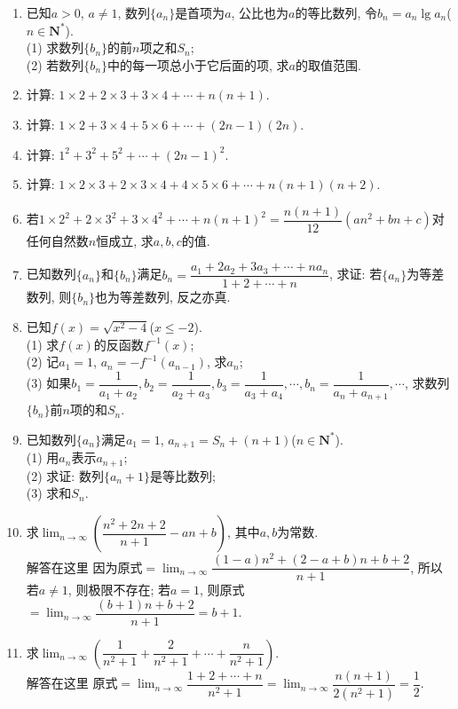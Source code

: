 \documentclass[10pt,a4paper]{article}
\begin{document}
\begin{enumerate}[1.]
\item 已知$a>0$, $a\ne 1$, 数列$\{a_n\}$是首项为$a$, 公比也为$a$的等比数列, 令$b_n=a_n\lg a_n$($n\in \mathbf{N}^*$).\\
(1) 求数列$\{b_n\}$的前$n$项之和$S_n$;\\
(2) 若数列$\{b_n\}$中的每一项总小于它后面的项, 求$a$的取值范围.
\item 计算: $1\times 2+2\times 3+3\times 4+\cdots +n(n+1)$.
\item 计算: $1\times 2+3\times 4+5\times 6+\cdots +(2n-1)(2n)$.
\item 计算: $1^2+3^2+5^2+\cdots +(2n-1)^2$.
\item 计算: $1\times 2\times 3+2\times 3\times 4+4\times 5\times 6+\cdots +n(n+1)(n+2)$.
\item 若$1\times 2^2+2\times 3^2+3\times 4^2+\cdots +n(n+1)^2=\dfrac{n(n+1)}{12}(an^2+bn+c)$对任何自然数$n$恒成立, 求$a,b,c$的值.
\item 已知数列$\{a_n\}$和$\{b_n\}$满足$b_n=\dfrac{{a_1}+2{a_2}+3{a_3}+\cdots +n{a_n}}{1+2+\cdots +n}$, 求证: 若$\{a_n\}$为等差数列, 则$\{b_n\}$也为等差数列, 反之亦真.
\item 已知$f(x)=\sqrt {x^2-4}$($x\le -2$).\\
(1) 求$f(x)$的反函数$f^{-1}(x)$;\\
(2) 记$a_1=1$, $a_n=-f^{-1}(a_{n-1})$, 求$a_n$;\\
(3) 如果$b_1=\dfrac 1{a_1+a_2},b_2=\dfrac 1{a_2+a_3},b_3=\dfrac 1{a_3+a_4},\cdots,b_n=\dfrac 1{a_n+a_{n+1}},\cdots$, 求数列$\{b_n\}$前$n$项的和$S_n$.
\item 已知数列$\{a_n\}$满足$a_1=1$, $a_{n+1}=S_n+(n+1)$($n\in \mathbf{N}^*$).\\
(1) 用$a_n$表示$a_{n+1}$;\\
(2) 求证: 数列$\{a_n+1\}$是等比数列;\\
(3) 求和$S_n$.
\item 求$\displaystyle \lim_{n\to \infty} (\dfrac{{n^2}+2n+2}{n+1}-an+b)$, 其中$a,b$为常数.\\
解答在这里  因为原式$=\displaystyle \lim_{n\to \infty} \dfrac{(1-a){n^2}+(2-a+b)n+b+2}{n+1}$, 所以若$a\ne 1$, 则极限不存在;
若$a=1$, 则原式$=\displaystyle \lim_{n\to \infty} \dfrac{(b+1)n+b+2}{n+1}=b+1$.
\item 求$\displaystyle \lim_{n\to \infty} (\dfrac 1{n^2+1}+\dfrac 2{n^2+1}+\cdots +\dfrac n{n^2+1})$.\\
解答在这里  原式$=\displaystyle \lim_{n\to \infty} \dfrac{1+2+\cdots +n}{{n^2}+1}=\displaystyle \lim_{n\to \infty} \dfrac{n(n+1)}{2({n^2}+1)}=\dfrac 12$.

\end{enumerate}
\end{document}
